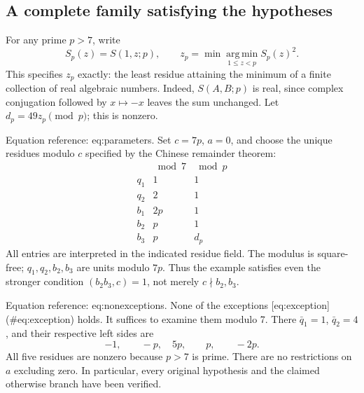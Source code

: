 \documentclass[10pt]{article}
\begin{document}
\subsection*{A complete family satisfying the hypotheses}
For any prime \(p>7\), write \[S_p(z)=S(1,z;p),\qquad
 z_p=\min\operatorname*{arg\,min}_{1\le z<p} S_p(z)^2.\] This specifies \(z_p\) exactly: the least residue attaining the minimum of a finite collection of real algebraic numbers. Indeed, \(S(A,B;p)\) is real, since complex conjugation followed by \(x\mapsto-x\) leaves the sum unchanged. Let \(d_p=49z_p\pmod p\); this is nonzero.\par
Equation reference: eq:parameters. Set \(c=7p\), \(a=0\), and choose the unique residues modulo \(c\) specified by the Chinese remainder theorem: \[
\begin{array}{c|cc}
 & \bmod 7 & \bmod p\\ \hline
 q_1 &1&1\\
 q_2 &2&1\\
 b_1 &2p&1\\
 b_2 &p&1\\
 b_3 &p&d_p
\end{array}\] All entries are interpreted in the indicated residue field. The modulus is square-free; \(q_1,q_2,b_2,b_3\) are units modulo \(7p\). Thus the example satisfies even the stronger condition \((b_2b_3,c)=1\), not merely \(c\nmid b_2,b_3\).\par
Equation reference: eq:nonexceptions. None of the exceptions [eq:exception] (\#eq:exception) holds. It suffices to examine them modulo 7. There \(\bar q_1=1\), \(\bar q_2=4\), and their respective left sides are \[
 -1,\qquad -p,\quad 5p,\qquad p,\qquad -2p .\] All five residues are nonzero because \(p>7\) is prime. There are no restrictions on \(a\) excluding zero. In particular, every original hypothesis and the claimed otherwise branch have been verified.\par
\end{document}
